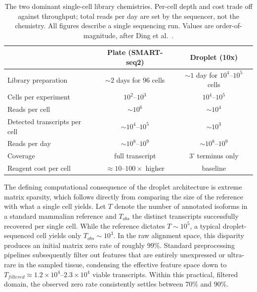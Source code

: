 \begin{table}[h]
\centering
\small
\setlength{\belowcaptionskip}{10pt}
\caption{The two dominant single-cell library chemistries. Per-cell depth and cost trade off against throughput; total reads per day are set by the sequencer, not the chemistry. All figures describe a single sequencing run. Values are order-of-magnitude, after Ding et al.\ \cite{ding2020systematic}.}\label{tab:protocols}
\begin{tabular}{lcc}
\toprule
 & \textbf{Plate (SMART-seq2)} & \textbf{Droplet (10x)} \\
\midrule
Library preparation & $\sim 2$ days for $96$ cells & $\sim 1$ day for $10^{4}$--$10^{5}$ cells \\
Cells per experiment & $10^{2}$--$10^{3}$ & $10^{4}$--$10^{5}$ \\
Reads per cell & $\sim 10^{6}$ & $\sim 10^{4}$ \\
Detected transcripts per cell & $\sim 10^{4}$--$10^{5}$ & $\sim 10^{3}$ \\
Reads per day & $\sim 10^{8}$--$10^{9}$ & $\sim 10^{8}$--$10^{9}$ \\
Coverage & full transcript & 3' terminus only \\
Reagent cost per cell & $\approx 10$--$100\times$ higher & baseline \\
\bottomrule
\end{tabular}
\end{table}

The defining computational consequence of the droplet architecture is extreme matrix \gls{sparsity}, which follows directly from comparing the size of the reference with what a single cell yields. Let $T$ denote the number of annotated isoforms in a standard mammalian reference and $T_{obs}$ the distinct transcripts successfully recovered per single cell. While the reference dictates $T \sim 10^5$, a typical droplet-sequenced cell yields only $T_{obs} \sim 10^3$. In the raw alignment space, this disparity produces an initial matrix zero rate of roughly $99\%$. Standard preprocessing pipelines subsequently filter out features that are entirely unexpressed or ultra-rare in the sampled tissue, condensing the effective feature space down to $T_{filtered} \approx 1.2 \times 10^4$--$2.3 \times 10^4$ viable transcripts. Within this practical, filtered domain, the observed zero rate consistently settles between $70\%$ and $90\%$. 

